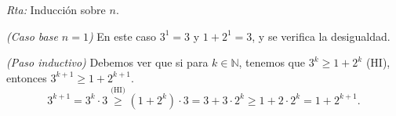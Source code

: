 \documentclass[a4paper,12pt,twoside,spanish,reqno]{amsbook}
\numberwithin{equation}{section}
\newcommand{\rta}{\noindent\textit{Rta: }}
\begin{document}
\begin{enumerate}[resume]
\begin{enumerate}
            \rta Inducción sobre $n$.
            
            \textit{(Caso base $n=1$) } En este caso $3^1 = 3$ y $1+2^1 = 3$, y se verifica la desigualdad.
            
            \textit{(Paso inductivo) } Debemos ver que si para $k \in \mathbb N$, tenemos que   $3^{k} \ge 1 + 2^k$ (HI),  entonces $3^{k+1} \ge 1 + 2^{k+1}$. 
            \begin{equation*}
            3^{k+1} = 3^k\cdot 3 \overset{\text{(HI)}}{\ge} (1 + 2^k) \cdot 3 = 3 + 3 \cdot 2^k \ge 1 + 2\cdot 2^k = 1 + 2^{k+1}.
            \end{equation*}
        
        \end{enumerate}

        
\end{enumerate}
    
    


    
\end{document}
